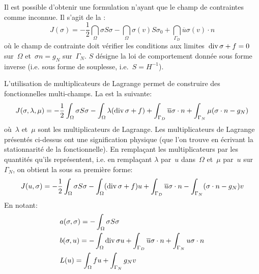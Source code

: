 \medskip
Il est possible d'obtenir une formulation n'ayant que le champ de contraintes comme inconnue. Il s'agit de la :
\begin{equation}
J(\sigma) =
-\frac12 \dint_\Omega \sigma S \sigma
-\dint_\Omega \sigma(v) S\sigma_0
+ \dint_{\Gamma_D} \overline{u} \sigma(v)\cdot n
\end{equation}
où le champ de contrainte doit vérifier les conditions aux limites~$\operatorname{div} \sigma + f =0$ sur~$\Omega$ et~$\sigma n = g_N$ sur~$\Gamma_N$. $S$ désigne la loi de comportement donnée sous forme inverse (i.e. sous forme de souplesse, i.e.~$S=H^{-1}$).

\medskip
L'utilisation de multiplicateurs de Lagrange permet de construire des fonctionnelles multi-champs. La  est la suivante:
\begin{equation}
J(\sigma,\lambda,\mu) =
-\frac12\displaystyle\int_\Omega \sigma S \sigma
-\displaystyle\int_\Omega \lambda (\operatorname{div} \sigma + f)
+ \displaystyle\int_{\Gamma_D} \overline{u}\sigma\cdot n
+ \displaystyle\int_{\Gamma_N} \mu (\sigma\cdot n -g_N)
\end{equation}
où~$\lambda$ et~$\mu$ sont les multiplicateurs de Lagrange.
\medskipvm
Les multiplicateurs de Lagrange présentés ci-dessus ont une signification physique (que l'on trouve en écrivant la stationnarité de la fonctionnelle). En remplaçant les multiplicateurs par les quantités qu'ils représentent, i.e. en remplaçant $\lambda$ par~$u$ dans~$\Omega$ et~$\mu$ par~$u$ sur~$\Gamma_N$, on obtient la  sous sa première forme:
\begin{equation}\label{Eq-Fonc-Reiss}
J(u,\sigma) =
-\frac12 \displaystyle\int_\Omega \sigma S \sigma
-\displaystyle\int_\Omega (\operatorname{div} \sigma+f) u
+ \displaystyle\int_{\Gamma_D} \overline{u}\sigma\cdot n
- \displaystyle\int_{\Gamma_N} (\sigma\cdot n-g_N) v
\end{equation}
En notant:
\begin{align} 
&a(\sigma,\sigma)=-\displaystyle\int_\Omega \sigma S\sigma\\
&b(\sigma,u)=-\displaystyle\int_\Omega \operatorname{div}\sigma u + \displaystyle\int_{\Gamma_D} \overline{u}\sigma\cdot n + \displaystyle\int_{\Gamma_N} u\sigma\cdot n\\
&L(u)=\displaystyle\int_\Omega fu + \displaystyle\int_{\Gamma_N} g_N v\end{align}
